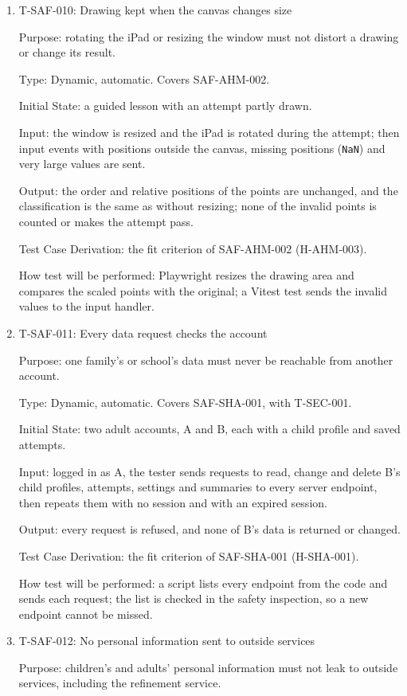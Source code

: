 \documentclass[12pt, titlepage]{article}
\newcommand{\testitem}[1]{\item #1\par\nopagebreak}
\begin{document}
\begin{enumerate}
\testitem{T-SAF-010: Drawing kept when the canvas changes size}

Purpose: rotating the iPad or resizing the window must not distort a drawing
or change its result.

Type: Dynamic, automatic. Covers SAF-AHM-002.

Initial State: a guided lesson with an attempt partly drawn.

Input: the window is resized and the iPad is rotated during the attempt;
then input events with positions outside the canvas, missing positions
(\texttt{NaN}) and very large values are sent.

Output: the order and relative positions of the points are unchanged, and
the classification is the same as without resizing; none of the invalid
points is counted or makes the attempt pass.

Test Case Derivation: the fit criterion of SAF-AHM-002 (H-AHM-003).

How test will be performed: Playwright resizes the drawing area and compares
the scaled points with the original; a Vitest test sends the invalid values
to the input handler.

\testitem{T-SAF-011: Every data request checks the account}

Purpose: one family's or school's data must never be reachable from another
account.

Type: Dynamic, automatic. Covers SAF-SHA-001, with T-SEC-001.

Initial State: two adult accounts, A and B, each with a child profile and
saved attempts.

Input: logged in as A, the tester sends requests to read, change and delete
B's child profiles, attempts, settings and summaries to every server
endpoint, then repeats them with no session and with an expired session.

Output: every request is refused, and none of B's data is returned or
changed.

Test Case Derivation: the fit criterion of SAF-SHA-001 (H-SHA-001).

How test will be performed: a script lists every endpoint from the code and
sends each request; the list is checked in the safety inspection, so a new
endpoint cannot be missed.

\testitem{T-SAF-012: No personal information sent to outside services}

Purpose: children's and adults' personal information must not leak to
outside services, including the refinement service.


\end{enumerate}
\end{document}
